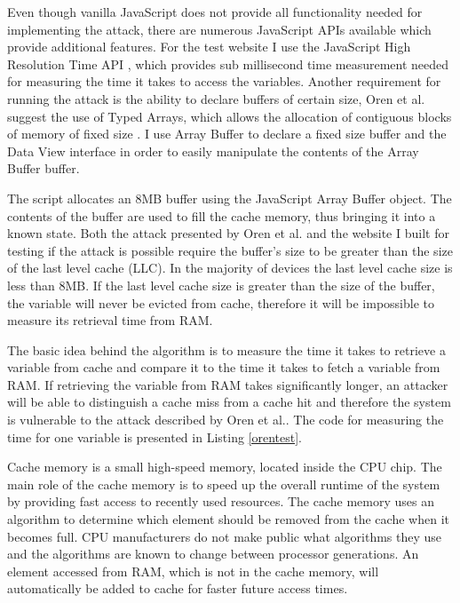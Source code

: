 \documentclass[10pt,a4paper,twoside]{book}
\begin{document}
Even though vanilla JavaScript does not provide all functionality needed for implementing the attack, there are numerous JavaScript APIs available which provide additional features. For the test website I use the JavaScript High Resolution Time API \cite{jshighresolutiontimeapi}, which provides sub millisecond time measurement needed for measuring the time it takes to access the variables. Another requirement for running the attack is the ability to declare buffers of certain size, Oren et al. suggest the use of Typed Arrays, which allows the allocation of contiguous blocks of memory of fixed size \cite{typedarrays}. I use Array Buffer \cite{arraybuffer} to declare a fixed size buffer and the Data View \cite{dataview} interface in order to easily manipulate the contents of the Array Buffer buffer.

The script allocates an 8MB buffer using the JavaScript Array Buffer object. The contents of the buffer are used to fill the cache memory, thus bringing it into a known state. Both the attack presented by Oren et al. and the website I built for testing if the attack is possible require the buffer's size to be greater than the size of the last level cache (LLC). In the majority of devices the last level cache size is less than 8MB. If the last level cache size is greater than the size of the buffer, the variable will never be evicted from cache, therefore it will be impossible to measure its retrieval time from RAM.

The basic idea behind the algorithm is to measure the time it takes to retrieve a variable from cache and compare it to the time it takes to fetch a variable from RAM. If retrieving the variable from RAM takes significantly longer, an attacker will be able to distinguish a cache miss from a cache hit and therefore the system is vulnerable to the attack described by Oren et al.\cite{oren2015spy}. The code for measuring the time for one variable is presented in Listing \ref{orentest}.

Cache memory is a small high-speed memory, located inside the CPU chip. The main role of the cache memory is to speed up the overall runtime of the system by providing fast access to recently used resources. The cache memory uses an algorithm to determine which element should be removed from the cache when it becomes full. CPU manufacturers do not make public what algorithms they use and the algorithms are known to change between processor generations. An element accessed from RAM, which is not in the cache memory, will automatically be added to cache for faster future access times. 
\end{document}
